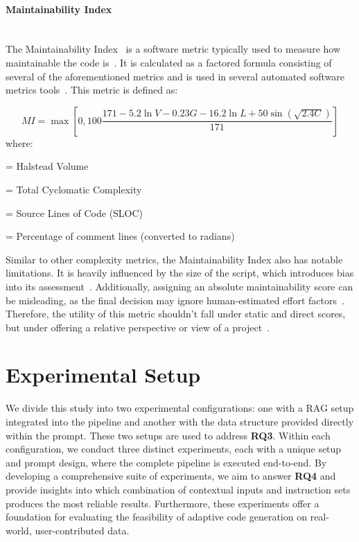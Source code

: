 \documentclass{DESSThesis}
\begin{document}
\paragraph{Maintainability Index}\mbox{}\\

\noindent The Maintainability Index~\cite{242525} is a software metric typically used to measure how maintainable the code is~\cite{radon,takerngsaksiri2025codereadabilityagelarge}. It is calculated as a factored formula consisting of several of the aforementioned metrics and is used in several automated software metrics tools~\cite{radon}. This metric is defined as:

\begin{equation}
    MI = \max[0, 100 \frac{171 - 5.2 \ln V - 0.23G - 16.2 \ln L + 50 \sin\left(\sqrt{2.4C}\right)}{171}]
\end{equation}
\noindent
where:
\begin{description}[noitemsep]
    \item[$V$] = Halstead Volume
    \item[$G$] = Total Cyclomatic Complexity
    \item[$L$] = Source Lines of Code (SLOC)
    \item[$C$] = Percentage of comment lines (converted to radians)
\end{description}

Similar to other complexity metrics, the Maintainability Index also has notable limitations. It is heavily influenced by the size of the script, which introduces bias into its assessment~\cite{7302435,gilboy_maintainability_2022}. Additionally, assigning an absolute maintainability score can be misleading, as the final decision may ignore human-estimated effort factors~\cite{welker2001software}. Therefore, the utility of this metric shouldn't fall under static and direct scores, but under offering a relative perspective or view of a project~\cite{gilboy_maintainability_2022}.

\section{Experimental Setup} \label{experimental_setup}

We divide this study into two experimental configurations: one with a RAG setup integrated into the pipeline and another with the data structure provided directly within the prompt. These two setups are used to address \textbf{RQ3}. Within each configuration, we conduct three distinct experiments, each with a unique setup and prompt design, where the complete pipeline is executed end-to-end. By developing a comprehensive suite of experiments, we aim to answer \textbf{RQ4} and provide insights into which combination of contextual inputs and instruction sets produces the most reliable results. Furthermore, these experiments offer a foundation for evaluating the feasibility of adaptive code generation on real-world, user-contributed data.
\end{document}
